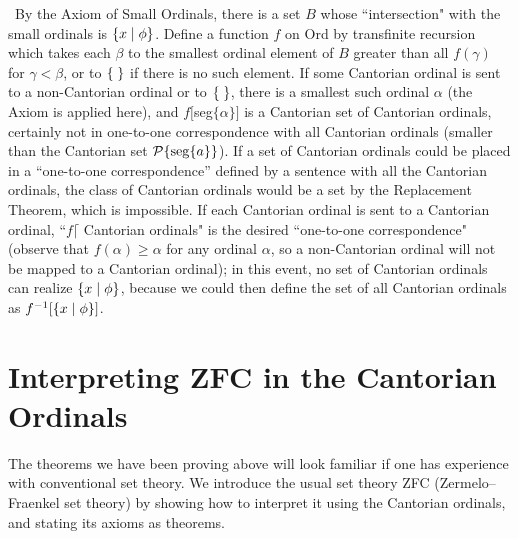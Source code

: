 \preuve\ By the Axiom of Small Ordinals, there
is a set $B$ whose ``intersection" with the
small ordinals is $\{x \mid \phi\}$.  Define 
a function $f$ on Ord by
transfinite recursion which takes each 
$\beta$ to the smallest ordinal element of $B$ greater than all
$f(\gamma)$ for $\gamma < \beta$, or to $\mbox{$\{\;\}$}$ if there is no such
element.  If some Cantorian ordinal is sent to a non-Cantorian ordinal
or to $\mbox{$\{\;\}$}$, there is a smallest such ordinal $\alpha$ (the Axiom is
applied here), and $f[$seg$\{\alpha\}]$ is a
Cantorian set of Cantorian ordinals, certainly not in one-to-one correspondence with all
Cantorian ordinals (smaller than the
Cantorian set ${\cal P}\{\mathop{\mathrm{seg}}\{a\}\}$).  If a set of
Cantorian ordinals could be placed in 
a ``one-to-one correspondence'' defined by a sentence with all the
Cantorian ordinals, the class of Cantorian ordinals would be a set by
the Replacement Theorem, which is impossible.
If each Cantorian ordinal is sent to a Cantorian ordinal, ``$f \lceil$
Cantorian ordinals" is the desired ``one-to-one correspondence" (observe that
$f(\alpha) \geq \alpha$ for any ordinal $\alpha$, so a non-Cantorian
ordinal will not be mapped to a Cantorian ordinal); in this event, no
set of Cantorian ordinals can realize $\{x \mid \phi\}$,
because we could then define the set of all Cantorian ordinals as $f^{-1}[\{x
\mid \phi\}]$.
\finpreuve


\vspace{-.7\baselineskip}

\section[ZFC in the Cantorian Ordinals]{Interpreting ZFC in the Cantorian\\
Ordinals}

\vspace{-.4\baselineskip}

The theorems we have been proving above will look familiar if
one has experience with conventional set theory.  We introduce the
usual set theory ZFC (Zermelo--Fraenkel set theory) by showing how to interpret it using the
Cantorian ordinals, and stating
its axioms as theorems.

